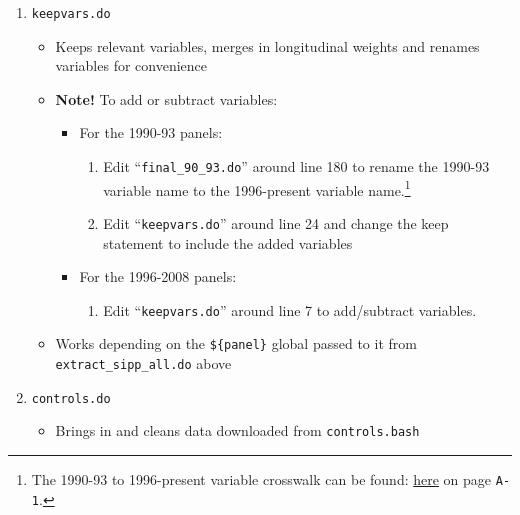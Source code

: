 \documentclass{article}
\begin{document}
\begin{enumerate}
\begin{itemize}
	\end{itemize}
\item {\tt keepvars.do}
	\begin{itemize}
	\item Keeps relevant variables, merges in longitudinal weights and renames variables for convenience
	\item {\bf Note!} To add or subtract variables:
	\begin{itemize}
		\item For the 1990-93 panels:  
		\begin{enumerate}
			\item Edit ``{\tt final\_90\_93.do}'' around line 180 to rename the 1990-93 variable name to the 					1996-present variable name.\footnote{The 1990-93 to 1996-present variable crosswalk can be found: \href{https://www.census.gov/content/dam/Census/programs-surveys/sipp/methodology/SIPP_USERS_Guide_Third_Edition_2001.pdf}{here} on page {\tt A-1}.}
			\item Edit ``{\tt keepvars.do}'' around line 24 and change the keep statement to include the added 				variables
		\end{enumerate} 
		\item For the 1996-2008 panels:
		\begin{enumerate}
			\item Edit ``{\tt keepvars.do}'' around line 7 to add/subtract variables.
		\end{enumerate}
	\end{itemize}
	\item Works depending on the {\tt \$\{panel\}} global passed to it from {\tt extract\_sipp\_all.do} above
	\end{itemize}
\item {\tt controls.do}
	\begin{itemize}
	\item Brings in and cleans data downloaded from {\tt controls.bash}
	\end{itemize}
\end{enumerate}
\end{document}
